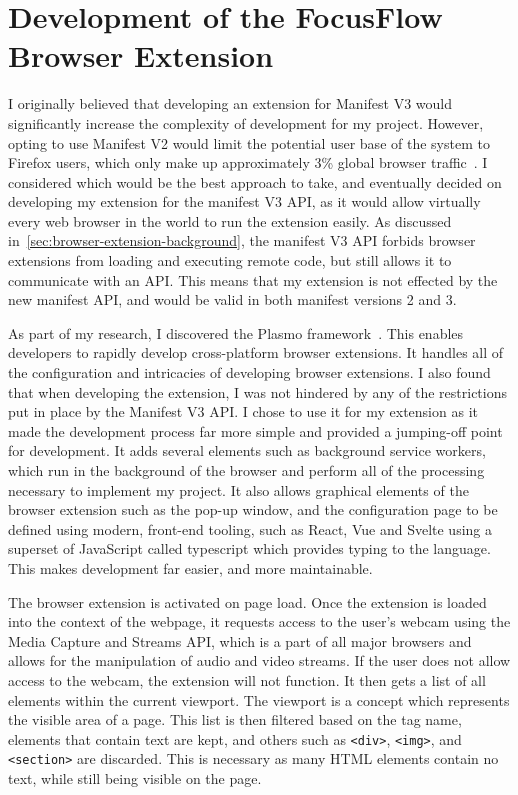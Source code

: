 \documentclass{report}
\begin{document}
\section{Development of the FocusFlow Browser Extension}

I originally believed that developing an extension for Manifest V3 would significantly increase the complexity of development for my project. However, opting to use Manifest V2 would limit the potential user base of the system to Firefox users, which only make up approximately 3\% global browser traffic~\cite{statcounter2024browser}. I considered which would be the best approach to take, and eventually decided on developing my extension for the manifest V3 API, as it would allow virtually every web browser in the world to run the extension easily. As discussed in~\autoref{sec:browser-extension-background}, the manifest V3 API forbids browser extensions from loading and executing remote code, but still allows it to communicate with an API. This means that my extension is not effected by the new manifest API, and would be valid in both manifest versions 2 and 3. 

As part of my research, I discovered the Plasmo framework~\cite{plasmo}. This enables developers to rapidly develop cross-platform browser extensions. It handles all of the configuration and intricacies of developing browser extensions. I also found that when developing the extension, I was not hindered by any of the restrictions put in place by the Manifest V3 API. I chose to use it for my extension as it made the development process far more simple and provided a jumping-off point for development. It adds several elements such as background service workers, which run in the background of the browser and perform all of the processing necessary to implement my project. It also allows graphical elements of the browser extension such as the pop-up window, and the configuration page to be defined using modern, front-end tooling, such as React, Vue and Svelte using a superset of JavaScript called typescript which provides typing to the language. This makes development far easier, and more maintainable.

The browser extension is activated on page load. Once the extension is loaded into the context of the webpage, it requests access to the user's webcam using the Media Capture and Streams API, which is a part of all major browsers and allows for the manipulation of audio and video streams. If the user does not allow access to the webcam, the extension will not function. It then gets a list of all elements within the current viewport. The viewport is a concept which represents the visible area of a page. This list is then filtered based on the tag name, elements that contain text are kept, and others such as \texttt{<div>}, \texttt{<img>}, and \texttt{<section>} are discarded. This is necessary as many HTML elements contain no text, while still being visible on the page. 
\end{document}
